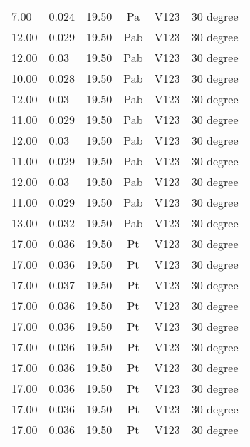 \begin{table}[t]
\begin{tabular}{l | l | l | c | c | l}
7.00           & 0.024           & 19.50  & Pa       & V123   & 30 degree           \\
12.00          & 0.029           & 19.50  & Pab      & V123   & 30 degree           \\
12.00          & 0.03            & 19.50  & Pab      & V123   & 30 degree           \\
10.00          & 0.028           & 19.50  & Pab      & V123   & 30 degree           \\
12.00          & 0.03            & 19.50  & Pab      & V123   & 30 degree           \\
11.00          & 0.029           & 19.50  & Pab      & V123   & 30 degree           \\
12.00          & 0.03            & 19.50  & Pab      & V123   & 30 degree           \\
11.00          & 0.029           & 19.50  & Pab      & V123   & 30 degree           \\
12.00          & 0.03            & 19.50  & Pab      & V123   & 30 degree           \\
11.00          & 0.029           & 19.50  & Pab      & V123   & 30 degree           \\
13.00          & 0.032           & 19.50  & Pab      & V123   & 30 degree           \\
17.00          & 0.036           & 19.50  & Pt       & V123   & 30 degree           \\
17.00          & 0.036           & 19.50  & Pt       & V123   & 30 degree           \\
17.00          & 0.037           & 19.50  & Pt       & V123   & 30 degree           \\
17.00          & 0.036           & 19.50  & Pt       & V123   & 30 degree           \\
17.00          & 0.036           & 19.50  & Pt       & V123   & 30 degree           \\
17.00          & 0.036           & 19.50  & Pt       & V123   & 30 degree           \\
17.00          & 0.036           & 19.50  & Pt       & V123   & 30 degree           \\
17.00          & 0.036           & 19.50  & Pt       & V123   & 30 degree           \\
17.00          & 0.036           & 19.50  & Pt       & V123   & 30 degree           \\
17.00          & 0.036           & 19.50  & Pt       & V123   & 30 degree           \\
\end{tabular}
\end{table}

